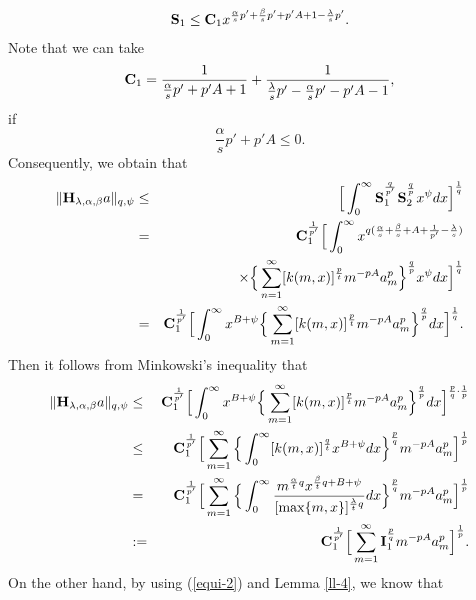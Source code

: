 \documentclass[10pt]{amsart}
\theoremstyle{definition}    %
\numberwithin{equation}{section}
\begin{document}
\begin{eqnarray}
{\bf S}_1\leq {\bf C}_1 x^{\frac{\alpha}{s}p'+\frac{\beta}{s}p'+p'A+1-\frac{\lambda}{s}p'}.\nonumber
\end{eqnarray}
Note that we can take 
\begin{eqnarray}
{\bf C}_1=\frac{1}{\frac{\alpha}{s}p'+p'A+1}+\frac{1}{\frac{\lambda}{s}p'-\frac{\alpha}{s}p'-p'A-1}, \nonumber
\end{eqnarray}
if \begin{equation}\label{con-1}\frac{\alpha}{s}p'+p'A\leq 0.\end{equation}
Consequently, we obtain that
 \begin{eqnarray}
\|{\bf H}_{\lambda, \alpha, \beta}a\|_{q, \psi}&\leq & \Big[\int_{0}^{\infty}{\bf S}_1^{^{\frac{q}{p'}}}{\bf S}_2^{^{\frac{q}{p}}}x^{\psi}dx\Big]^{\frac{1}{q}}\nonumber \\
&=&{\bf C}_1^{\frac{1}{p'}}\Big[\int_{0}^{\infty}x^{q(\frac{\alpha}{s}+\frac{\beta}{s}+A+\frac{1}{p'}-\frac{\lambda}{s})}\nonumber \\
&&\quad\quad\quad \times \Big\{\sum_{n=1}^{\infty}[k(m,x)]^{\frac{p}{t}}m^{-pA}a_m^p\Big\}^{\frac{q}{p}}x^{\psi}dx\Big]^{\frac{1}{q}}
\nonumber \\
&=& {\bf C}_1^{\frac{1}{p'}}\Big[\int_{0}^{\infty}x^{B+\psi}\Big\{\sum_{m=1}^{\infty}[k(m,x)]^{\frac{p}{t}}m^{-pA}a_m^p\Big\}^{\frac{q}{p}}dx\Big]^{\frac{1}{q}}. \nonumber
\end{eqnarray}
Then it follows from Minkowski's inequality that 
 \begin{eqnarray}
\|{\bf H}_{\lambda, \alpha, \beta}a\|_{q, \psi}&\leq & {\bf C}_1^{\frac{1}{p'}}\Big[\int_{0}^{\infty}x^{B+\psi}\Big\{\sum_{m=1}^{\infty}[k(m,x)]^{\frac{p}{t}}m^{-pA}a_m^p\Big\}^{\frac{q}{p}}dx\Big]^{\frac{p}{q}\cdot\frac{1}{p}} \nonumber \\
&\leq & {\bf C}_1^{\frac{1}{p'}}\Big[\sum_{m=1}^{\infty}\Big\{\int_{0}^{\infty}[k(m,x)]^{\frac{q}{t}}x^{B+\psi}dx\Big\}^{\frac{p}{q}}m^{-pA}a_m^p\Big]^{\frac{1}{p}} \nonumber \\
&=& {\bf C}_1^{\frac{1}{p'}}\Big[\sum_{m=1}^{\infty}\Big\{\int_{0}^{\infty}\frac{m^{\frac{\alpha}{t}q}x^{\frac{\beta}{t}q+B+\psi}}{[\max\{m,x\}]^{\frac{\lambda}{t}q}}dx\Big\}^{\frac{p}{q}}m^{-pA}a_m^p\Big]^{\frac{1}{p}}\nonumber \\
&:=& {\bf C}_1^{\frac{1}{p'}}\Big[\sum_{m=1}^{\infty}{\bf I}_1^{\frac{p}{q}}m^{-pA}a_m^p\Big]^{\frac{1}{p}}. \nonumber
\end{eqnarray}
On the other hand, by using (\ref{equi-2}) and Lemma \ref{ll-4}, we know that   
\end{document}
